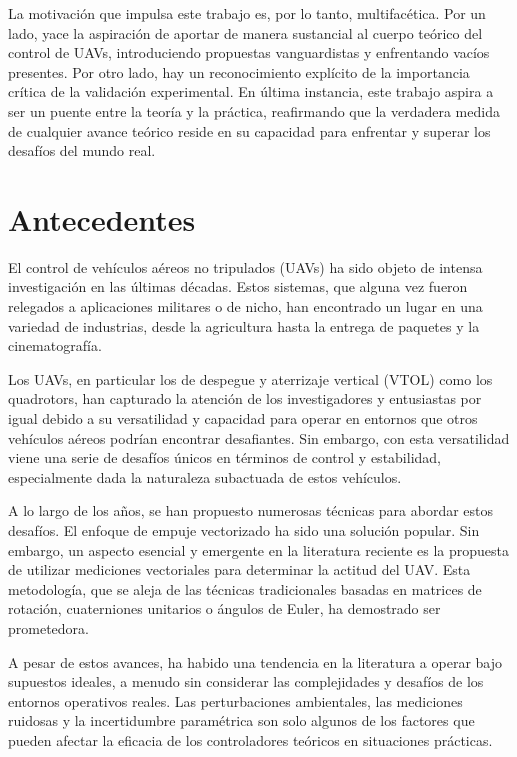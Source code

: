 La motivación que impulsa este trabajo es, por lo tanto, multifacética. Por un lado, yace la aspiración de aportar de manera sustancial al cuerpo teórico del control de UAVs, introduciendo propuestas vanguardistas y enfrentando vacíos presentes. Por otro lado, hay un reconocimiento explícito de la importancia crítica de la validación experimental. En última instancia, este trabajo aspira a ser un puente entre la teoría y la práctica, reafirmando que la verdadera medida de cualquier avance teórico reside en su capacidad para enfrentar y superar los desafíos del mundo real.


\section{Antecedentes}

El control de vehículos aéreos no tripulados (UAVs) ha sido objeto de intensa investigación en las últimas décadas. Estos sistemas, que alguna vez fueron relegados a aplicaciones militares o de nicho, han encontrado un lugar en una variedad de industrias, desde la agricultura hasta la entrega de paquetes y la cinematografía.

Los UAVs, en particular los de despegue y aterrizaje vertical (VTOL) como los quadrotors, han capturado la atención de los investigadores y entusiastas por igual debido a su versatilidad y capacidad para operar en entornos que otros vehículos aéreos podrían encontrar desafiantes. Sin embargo, con esta versatilidad viene una serie de desafíos únicos en términos de control y estabilidad, especialmente dada la naturaleza subactuada de estos vehículos.

A lo largo de los años, se han propuesto numerosas técnicas para abordar estos desafíos. El enfoque de empuje vectorizado ha sido una solución popular. Sin embargo, un aspecto esencial y emergente en la literatura reciente es la propuesta de utilizar mediciones vectoriales para determinar la actitud del UAV. Esta metodología, que se aleja de las técnicas tradicionales basadas en matrices de rotación, cuaterniones unitarios o ángulos de Euler, ha demostrado ser prometedora.

A pesar de estos avances, ha habido una tendencia en la literatura a operar bajo supuestos ideales, a menudo sin considerar las complejidades y desafíos de los entornos operativos reales. Las perturbaciones ambientales, las mediciones ruidosas y la incertidumbre paramétrica son solo algunos de los factores que pueden afectar la eficacia de los controladores teóricos en situaciones prácticas.

